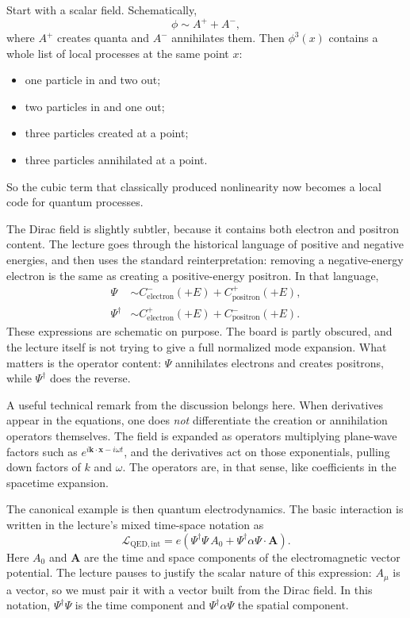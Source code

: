 Start with a scalar field. Schematically,
\begin{equation}
\phi \sim A^+ + A^-,
\end{equation}
where \(A^+\) creates quanta and \(A^-\) annihilates them. Then \(\phi^3(x)\) contains a whole list of local processes at the same point \(x\):
\begin{itemize}
\item one particle in and two out;
\item two particles in and one out;
\item three particles created at a point;
\item three particles annihilated at a point.
\end{itemize}
So the cubic term that classically produced nonlinearity now becomes a local code for quantum processes.

The Dirac field is slightly subtler, because it contains both electron and positron content. The lecture goes through the historical language of positive and negative energies, and then uses the standard reinterpretation: removing a negative-energy electron is the same as creating a positive-energy positron. In that language,
\begin{align}
\Psi &\sim C^-_{\text{electron}}(+E)+C^+_{\text{positron}}(+E),
\\
\Psi^\dagger &\sim C^+_{\text{electron}}(+E)+C^-_{\text{positron}}(+E).
\end{align}
These expressions are schematic on purpose. The board is partly obscured, and the lecture itself is not trying to give a full normalized mode expansion. What matters is the operator content: \(\Psi\) annihilates electrons and creates positrons, while \(\Psi^\dagger\) does the reverse.

A useful technical remark from the discussion belongs here. When derivatives appear in the equations, one does \emph{not} differentiate the creation or annihilation operators themselves. The field is expanded as operators multiplying plane-wave factors such as \(e^{i\mathbf k\cdot \mathbf x-i\omega t}\), and the derivatives act on those exponentials, pulling down factors of \(k\) and \(\omega\). The operators are, in that sense, like coefficients in the spacetime expansion.

The canonical example is then quantum electrodynamics. The basic interaction is written in the lecture's mixed time-space notation as
\begin{equation}
\mathcal L_{\mathrm{QED,int}}
=
e\left(\Psi^\dagger\Psi\,A_0+\Psi^\dagger\alpha\Psi\cdot\mathbf A\right).
\end{equation}
Here \(A_0\) and \(\mathbf A\) are the time and space components of the electromagnetic vector potential. The lecture pauses to justify the scalar nature of this expression: \(A_\mu\) is a vector, so we must pair it with a vector built from the Dirac field. In this notation, \(\Psi^\dagger\Psi\) is the time component and \(\Psi^\dagger\alpha\Psi\) the spatial component.

